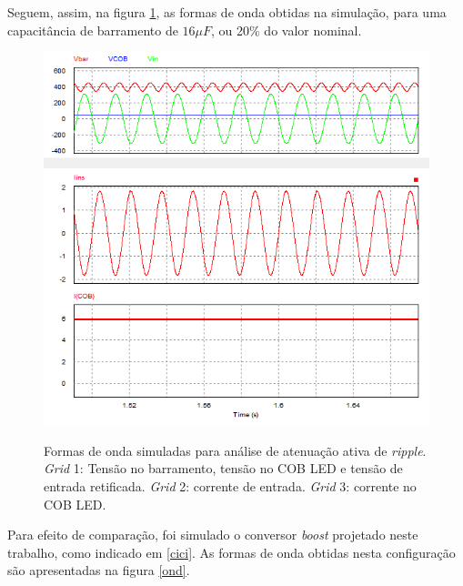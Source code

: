 \documentclass[
        12pt,
        openany, %
        oneside, %
        a4paper,			
        english,			
        brazil
        ]{abntbibufjf}
\begin{document}
Seguem, assim, na figura \ref{ond2}, as formas de onda obtidas na simulação, para uma capacitância de barramento de $16\mu F$, ou 20\% do valor nominal.

\begin{figure}[!h]
	\centering
	\caption{Formas de onda simuladas para análise de atenuação ativa de \textit{ripple}. \textit{Grid} 1: Tensão no barramento, tensão no COB LED e tensão de entrada retificada. \textit{Grid} 2: corrente de entrada. \textit{Grid} 3: corrente no COB LED.}
	\includegraphics[scale=.65]{../GRAFICOS/ond2}\\
	\label{ond2}
\end{figure}

Para efeito de comparação, foi simulado o conversor \textit{boost} projetado neste trabalho, como indicado em \ref{cici}. As formas de onda obtidas nesta configuração são apresentadas na figura \ref{ond}.
\end{document}
